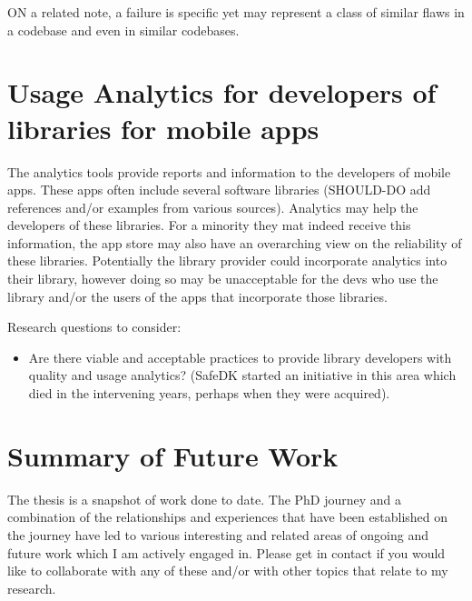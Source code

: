 ON a related note, a failure is specific yet may represent a class of similar flaws in a codebase and even in similar codebases. 


\section{Usage Analytics for developers of libraries for mobile apps}
The analytics tools provide reports and information to the developers of mobile apps. These apps often include several software libraries (SHOULD-DO add references and/or examples from various sources). Analytics may help the developers of these libraries. For a minority they mat indeed receive this information, the app store may also have an overarching view on the reliability of these libraries. Potentially the library provider could incorporate analytics into their library, however doing so may be unacceptable for the devs who use the library and/or the users of the apps that incorporate those libraries.

Research questions to consider:
\begin{itemize}
    \item Are there viable and acceptable practices to provide library developers with quality and usage analytics? (SafeDK started an initiative in this area which died in the intervening years, perhaps when they were acquired).
\end{itemize}


\section{Summary of Future Work}
The thesis is a snapshot of work done to date. The PhD journey and a combination of the relationships and experiences that have been established on the journey have led to various interesting and related areas of ongoing and future work which I am actively engaged in. Please get in contact if you would like to collaborate with any of these and/or with other topics that relate to my research.
